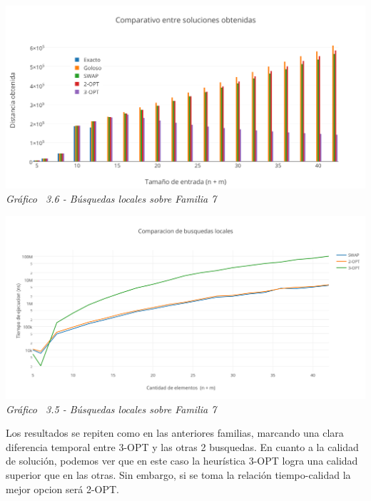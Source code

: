   \vspace*{0.3cm} \vspace*{0.3cm}
  \begin{center}
 \includegraphics[scale=0.5]{./EJ3/comparacionbusquedaslocalessolucionanillos.png}\\
 {            \textit{Gráfico \ 3.6 - Búsquedas locales sobre Familia 7}}
  \end{center}
  \vspace*{0.3cm}

\vspace*{0.3cm} \vspace*{0.3cm}
  \begin{center}
 \includegraphics[scale=0.5]{./EJ3/comparacionbusquedaslocalesanillos.png}\\
 {            \textit{Gráfico \ 3.5 - Búsquedas locales sobre Familia 7}}
  \end{center}
  \vspace*{0.3cm}
  
  
  Los resultados se repiten como en las anteriores familias, marcando una clara diferencia temporal entre 3-OPT y las otras 2 busquedas. En cuanto a la calidad de soluci\'on, podemos ver que en este caso la heur\'istica 3-OPT logra una calidad superior que en las otras. Sin embargo, si se toma la relaci\'on tiempo-calidad la mejor opcion ser\'a 2-OPT.
  
